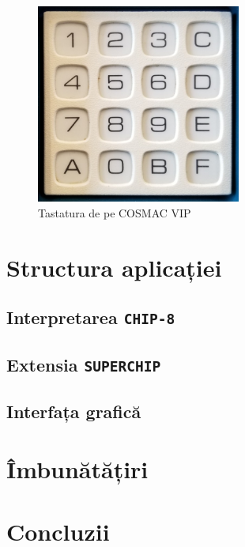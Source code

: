 \documentclass[a4paper]{article}
\begin{document}
\begin{figure}
	\begin{center}
		\includegraphics[width=0.6\textwidth]{figures/cosmac-vip-keypad.png}
	\end{center}
	\caption{Tastatura de pe COSMAC VIP}
	\label{fig:keypad}
\end{figure}

\section{Structura aplicației}
\subsection{Interpretarea \texttt{CHIP-8}}
\subsection{Extensia \texttt{SUPERCHIP}}
\subsection{Interfața grafică}

\section{Îmbunătățiri}

\section{Concluzii}

\newpage
\printbibliography[title=\section{Bibliografie}]

\renewcommand\listoflistingscaption{\section{Listinguri de cod sursă}}
\listoflistings
\end{document}
